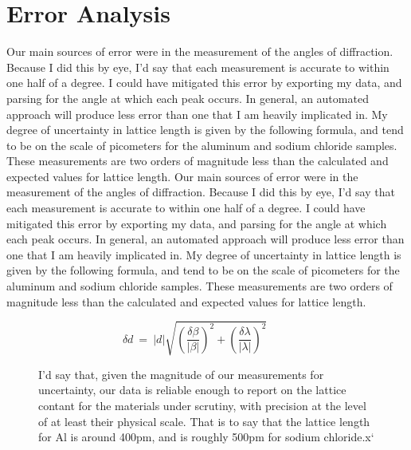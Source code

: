 \documentclass{amsart}
\begin{document}
\section{Error Analysis}
Our main sources of error were in the measurement of the angles of diffraction. Because I did this by eye, I'd say that each measurement is accurate to within one half of a degree. I could have mitigated this error by exporting my data, and parsing for the angle at which each peak occurs. In general, an automated approach will produce less error than one that I am heavily implicated in. My degree of uncertainty in lattice length is given by the following formula, and tend to be on the scale of picometers for the aluminum and sodium chloride samples. These measurements are two orders of magnitude less than the calculated and expected values for lattice length. Our main sources of error were in the measurement of the angles of diffraction. Because I did this by eye, I'd say that each measurement is accurate to within one half of a degree. I could have mitigated this error by exporting my data, and parsing for the angle at which each peak occurs. In general, an automated approach will produce less error than one that I am heavily implicated in. My degree of uncertainty in lattice length is given by the following formula, and tend to be on the scale of picometers for the aluminum and sodium chloride samples. These measurements are two orders of magnitude less than the calculated and expected values for lattice length.
\vspace{-0.2cm}
\begin{figure}[H]
    \begin{minipage}{0.3\textwidth}
        \[\delta d \ = \ |d|\sqrt{\left(\dfrac {\delta \beta }{|\beta|}\right)^2 + \left(\dfrac{\delta \lambda}{|\lambda|}\right)^2} \ \ \ \ \ \ \ \ \ \ \]
    \end{minipage}
    \begin{minipage}{0.65\textwidth}
        I'd say that, given the magnitude of our measurements for uncertainty, our data is reliable enough to report on the lattice contant for the materials under scrutiny, with precision at the level of at least their physical scale. That is to say that the lattice length for Al is around 400pm, and is roughly 500pm for sodium chloride.x`
    \end{minipage}
\end{figure}
\end{document}
